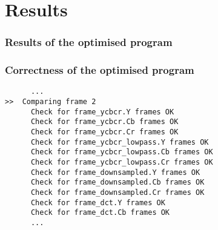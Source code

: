 \section{Results}
\begin{frame}
  \frametitle{Results of the optimised program}
  \begin{figure}[h]
    \centering
  \end{figure}
\end{frame}

\begin{frame}[fragile]
  \frametitle{Correctness of the optimised program}
\begin{verbatim}
      ...
>>  Comparing frame 2
      Check for frame_ycbcr.Y frames OK
      Check for frame_ycbcr.Cb frames OK
      Check for frame_ycbcr.Cr frames OK
      Check for frame_ycbcr_lowpass.Y frames OK
      Check for frame_ycbcr_lowpass.Cb frames OK
      Check for frame_ycbcr_lowpass.Cr frames OK
      Check for frame_downsampled.Y frames OK
      Check for frame_downsampled.Cb frames OK
      Check for frame_downsampled.Cr frames OK
      Check for frame_dct.Y frames OK
      Check for frame_dct.Cb frames OK
      ...
\end{verbatim}
\end{frame}

